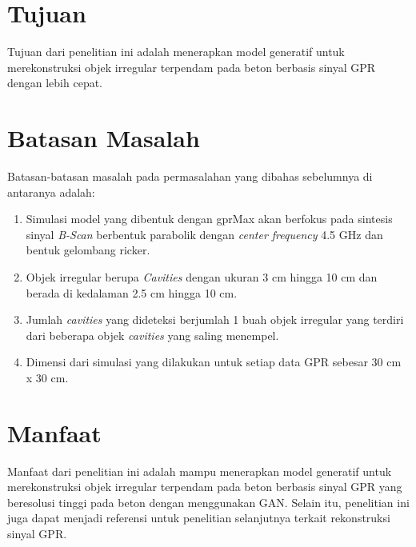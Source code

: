 \section{Tujuan}
\label{sec:Tujuan}

Tujuan dari penelitian ini adalah menerapkan model generatif untuk merekonstruksi objek irregular terpendam pada beton berbasis sinyal GPR dengan lebih cepat.

\section{Batasan Masalah}
\label{sec:batasanmasalah}

Batasan-batasan masalah pada permasalahan yang dibahas sebelumnya di antaranya adalah:

\begin{enumerate}[nolistsep]

  \item Simulasi model yang dibentuk dengan gprMax akan berfokus pada sintesis sinyal \emph{B-Scan} berbentuk parabolik dengan \emph{center frequency} 4.5 GHz dan bentuk gelombang ricker.

  \item Objek irregular berupa \emph{Cavities} dengan ukuran 3 cm hingga 10 cm dan berada di kedalaman 2.5 cm hingga 10 cm.
  
  \item Jumlah \emph{cavities} yang dideteksi berjumlah 1 buah objek irregular yang terdiri dari beberapa objek \emph{cavities} yang saling menempel.

  \item Dimensi dari simulasi yang dilakukan untuk setiap data GPR sebesar 30 cm x 30 cm.

\end{enumerate}

\section{Manfaat}
\label{sec:manfaat}

Manfaat dari penelitian ini adalah mampu menerapkan model generatif untuk merekonstruksi objek irregular terpendam pada beton berbasis sinyal GPR yang beresolusi tinggi pada beton dengan menggunakan GAN. 
Selain itu, penelitian ini juga dapat menjadi referensi untuk penelitian selanjutnya terkait rekonstruksi sinyal GPR.
